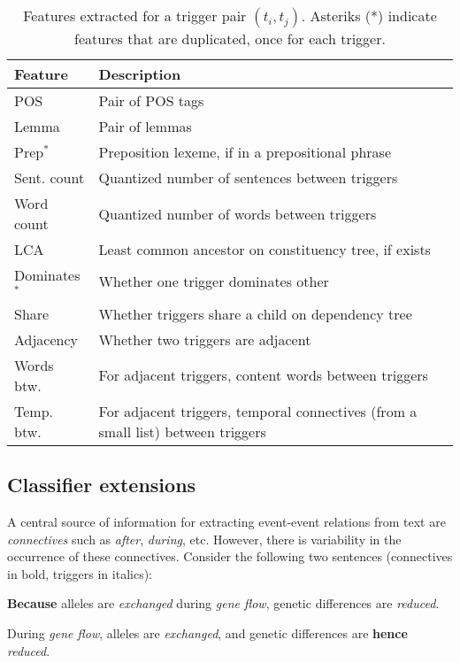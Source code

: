 \begin{table}[t]
\setlength{\tabcolsep}{5pt}
{\scriptsize
\hfill{}
\begin{tabular}{|p{1.3cm}|p{6cm}|}
\hline
\textbf{Feature} &\textbf{Description}\\
\hline
 POS & \scriptsize{Pair of POS tags} \\
Lemma & \scriptsize{Pair of lemmas} \\
Prep$^*$ & \scriptsize{Preposition lexeme, if in a prepositional phrase} \\
Sent. count & \scriptsize{Quantized number of sentences between triggers} \\
Word count & \scriptsize{Quantized number of words between triggers} \\
LCA & \scriptsize{Least common ancestor on constituency tree, if exists} \\
Dominates$^*$ & \scriptsize{Whether one trigger dominates other} \\
Share & \scriptsize{Whether triggers share a child on dependency tree} \\
Adjacency & \scriptsize{Whether two triggers are adjacent} \\
Words btw. & \scriptsize{For adjacent triggers, content words between triggers} \\
Temp. btw. & \scriptsize{For adjacent triggers, temporal connectives (from a small list) between triggers} \\
\hline
\end{tabular}}
\hfill{}
\caption{Features extracted for a trigger pair $(t_i,t_j)$. Asteriks (*) indicate features that are duplicated, once for each trigger.}
\label{tab:features}
\end{table}

\subsection{Classifier extensions} \label{subsec:pairwise-novel}

A central source of information for extracting event-event relations from text are \emph{connectives} such as \emph{after}, \emph{during}, etc. However, there is variability in the occurrence of these connectives. Consider the following two sentences (connectives in bold, triggers in italics):

\begin{enumerate}[itemsep=0pt,topsep=0pt] \footnotesize{
\item \textbf{Because} alleles are \emph{exchanged} during \emph{gene flow}, genetic differences are \emph{reduced}. \label{sent:1}
\item During \emph{gene flow}, alleles are \emph{exchanged}, and genetic differences are \textbf{hence} \emph{reduced}. \label{sent:2}}
\end{enumerate}

